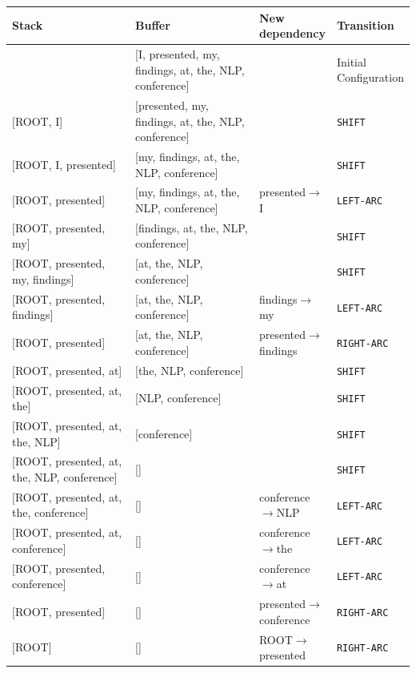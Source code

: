 \begin{parts}
    \begin{adjustwidth}{-3.5cm}{}
    \begin{tabular}{ p{0.35\linewidth}| p{0.35\linewidth} | p{0.18\linewidth} | p{0.12\linewidth}}
    Stack & Buffer & New dependency & Transition \\ \hline
    [ROOT] & [I, presented, my, findings, at, the, NLP, conference] &  & Initial Configuration \\ \hline
    $[$ROOT, I] & [presented, my, findings, at, the, NLP, conference] &  &  \texttt{SHIFT}  \\ \hline
    $[$ROOT, I, presented] & [my, findings, at, the, NLP, conference] &  &  \texttt{SHIFT}  \\ \hline
    $[$ROOT, presented] & [my, findings, at, the, NLP, conference] & presented$\to$I &  \texttt{LEFT-ARC}  \\ \hline
    $[$ROOT, presented, my] & [findings, at, the, NLP, conference] &  &  \texttt{SHIFT}  \\ \hline
    $[$ROOT, presented, my, findings] & [at, the, NLP, conference] &  &  \texttt{SHIFT}  \\ \hline
    $[$ROOT, presented, findings] & [at, the, NLP, conference] & findings$\to$my &  \texttt{LEFT-ARC}  \\ \hline
    $[$ROOT, presented] & [at, the, NLP, conference] & presented$\to$findings &  \texttt{RIGHT-ARC}  \\ \hline
    $[$ROOT, presented, at] & [the, NLP, conference] & &  \texttt{SHIFT}  \\ \hline
    $[$ROOT, presented, at, the] & [NLP, conference] & &  \texttt{SHIFT}  \\ \hline
    $[$ROOT, presented, at, the, NLP] & [conference] & &  \texttt{SHIFT}  \\ \hline
    $[$ROOT, presented, at, the, NLP, conference] & [] & &  \texttt{SHIFT}  \\ \hline
    $[$ROOT, presented, at, the, conference] & [] & conference$\to$NLP &  \texttt{LEFT-ARC}  \\ \hline
    $[$ROOT, presented, at, conference] & [] & conference$\to$the &  \texttt{LEFT-ARC}  \\ \hline
    $[$ROOT, presented, conference] & [] & conference$\to$at &  \texttt{LEFT-ARC}  \\ \hline
    $[$ROOT, presented] & [] & presented$\to$conference &  \texttt{RIGHT-ARC}  \\ \hline
    $[$ROOT] & [] & ROOT$\to$presented &  \texttt{RIGHT-ARC}  \\ \hline
    \end{tabular}\newline
    \end{adjustwidth}
    

\end{parts}
